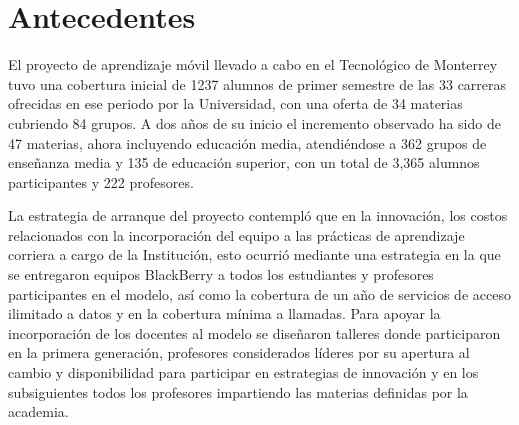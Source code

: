 
\chapter{Antecedentes}

El proyecto de aprendizaje m\'ovil llevado a cabo en el Tecnol\'ogico de Monterrey tuvo una cobertura inicial de 1237 alumnos de primer semestre de las 33 carreras ofrecidas en ese periodo por la Universidad, con una oferta de 34 materias cubriendo 84 grupos. A dos a\~nos de su inicio el incremento observado ha sido de 47 materias, ahora incluyendo educaci\'on media, atendi\'endose a 362 grupos de ense\~nanza media y 135 de educaci\'on superior, con un total de  3,365 alumnos participantes y 222 profesores.

La estrategia de arranque del proyecto contempl\'o que en la innovaci\'on, los costos relacionados con la incorporaci\'on del equipo a las pr\'acticas de aprendizaje corriera a cargo de la Instituci\'on, esto ocurri\'o mediante una estrategia en la que se entregaron equipos BlackBerry a todos los estudiantes y profesores participantes en el modelo, as\'i como la cobertura de un a\~no de servicios de acceso ilimitado a datos y en la cobertura mínima a llamadas. Para apoyar la incorporaci\'on de los docentes al modelo se dise\~naron talleres donde participaron en la primera generaci\'on, profesores considerados l\'ideres por su apertura al cambio y disponibilidad para participar en estrategias de innovaci\'on y en los subsiguientes todos los profesores impartiendo las materias definidas por la academia.
